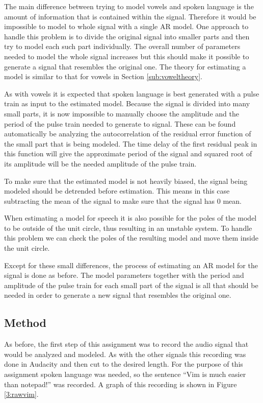 \documentclass{IEEEtran}
\begin{document}
The main difference between trying to model vowels and spoken language
is the amount of information that is contained within the signal.
Therefore it would be impossible to model to whole signal with a
single AR model. One approach to handle this problem is to divide
the original signal into smaller parts and then try to model each such
part individually. The overall number of parameters needed to model the
whole signal increases but this should make it possible to generate a
signal that resembles the original one. The theory for estimating a
model is similar to that for vowels in Section \ref{sub:voweltheory}.

As with vowels it is expected that spoken language is best generated
with a pulse train as input to the estimated model. Because the signal
is divided into many small parts, it is now impossible to manually choose
the amplitude and the period of the pulse train needed to generate to
signal. These can be found automatically be analyzing the autocorrelation
of the residual error function of the small part that is being modeled.
The time delay of the first
residual peak in this function will give the approximate period of the
signal and squared root of its amplitude will be the needed amplitude of
the pulse train.

To make sure that the estimated model is not heavily biased, the signal
being modeled should be detrended before estimation. This means in this
case subtracting the mean of the signal to make sure that the
signal has $0$ mean.

When estimating a model for speech it is also possible for the poles
of the model to be outside of the unit circle, thus resulting in an
unstable system. To handle this problem we can check the poles of the
resulting model and move them inside the unit circle.

Except for these small differences, the process of estimating an AR
model for the signal is done as before. The model parameters together
with the period and amplitude of the pulse train for each small part
of the signal is all that should be needed in order to generate a new
signal that resembles the original one.

\subsection{Method}
As before, the first step of this assignment was to record the audio
signal that would be analyzed and modeled. As with the other signals
this recording was done in Audacity \cite{audacity} and then cut to
the desired length. For the purpose of this assignment spoken language
was needed, so the sentence ``Vim is much easier than notepad!'' was
recorded. A graph of this recording is shown in Figure \ref{3:rawvim}.
\end{document}
